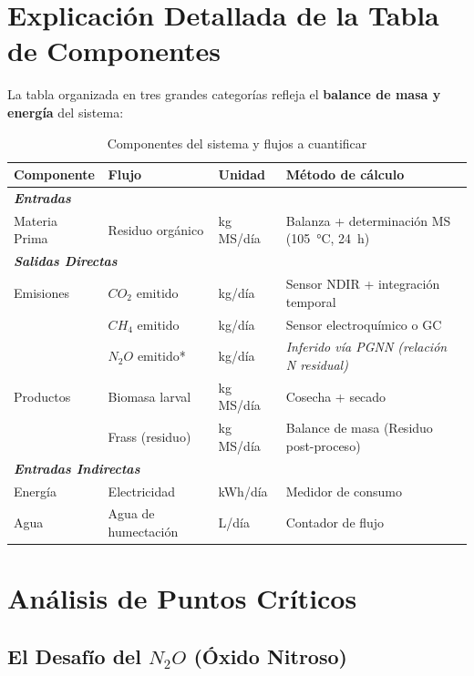 \documentclass[12pt]{article}
\begin{document}
\section{Explicación Detallada de la Tabla de Componentes}

La tabla organizada en tres grandes categorías refleja el \textbf{balance de masa y energía} del sistema:

\begin{table}[H]
\centering
\small
\caption{Componentes del sistema y flujos a cuantificar}
\label{tab:componentes_sistema}
\begin{tabularx}{\textwidth}{@{} l l l X @{}}
\toprule
\textbf{Componente} & \textbf{Flujo} & \textbf{Unidad} & \textbf{Método de cálculo} \\
\midrule
\multicolumn{4}{l}{\textit{\textbf{Entradas}}} \\
Materia Prima & Residuo orgánico & kg MS/día & Balanza + determinación MS (\SI{105}{\celsius}, \SI{24}{\hour}) \\
\midrule
\multicolumn{4}{l}{\textit{\textbf{Salidas Directas}}} \\
Emisiones & $CO_{2}$ emitido & kg/día & Sensor NDIR + integración temporal \\
          & $CH_{4}$ emitido & kg/día & Sensor electroquímico o GC \\
          & $N_{2}O$ emitido* & kg/día & \textit{Inferido vía PGNN (relación N residual)} \\
Productos & Biomasa larval & kg MS/día & Cosecha + secado \\
          & Frass (residuo) & kg MS/día & Balance de masa (Residuo post-proceso) \\
\midrule
\multicolumn{4}{l}{\textit{\textbf{Entradas Indirectas}}} \\
Energía & Electricidad & kWh/día & Medidor de consumo \\
Agua & Agua de humectación & L/día & Contador de flujo \\
\bottomrule
\end{tabularx}
\end{table}

\section{Análisis de Puntos Críticos}

\subsection{El Desafío del $N_2O$ (Óxido Nitroso)}
\end{document}

